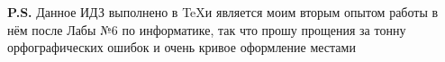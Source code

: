 \documentclass[fleqn, 12pt]{article}
\begin{document}

\setlength{\mathindent}{0.0pt}
\tableofcontents

\vfill
{\bf P.S.} Данное ИДЗ выполнено в \TeX \space и является моим вторым опытом работы в нём после Лабы №6 по информатике, 
так что прошу прощения за тонну орфографических ошибок и очень кривое оформление местами






\end{document}
